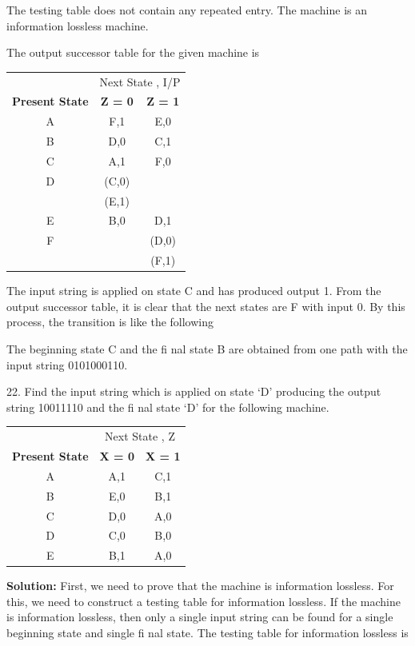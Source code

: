 \documentclass{beamer}
\begin{document}
\begin{frame}
	The testing table does not contain any repeated entry. The machine is an information lossless machine.
	
	The output successor table for the given machine is
	
	\begin{center}
		\begin{tabular}{ccc}
			\hline
			& \multicolumn{2}{c}{Next State , I/P}\\
			\cline{2-3}
			\textbf{Present State} & \textbf{Z = 0} & \textbf{Z = 1}\\
			\hline
			A & F,1 & E,0\\
			B & D,0 & C,1\\
			C & A,1 & F,0\\
			D & (C,0)\\
			& (E,1)\\
			E & B,0 & D,1\\
			F & & (D,0)\\
			& & (F,1)\\
			\hline
		\end{tabular}
	\end{center}
\end{frame}
	\begin{frame}
		The input string is applied on state C and has produced output 1. From the output successor table, it is clear that the next states are F with input 0. By this process, the transition is like the following
		
		
		The beginning state C and the ﬁ nal state B are obtained from one path with the input string 0101000110. 
		
		22. Find the input string which is applied on state ‘D’ producing the output string 10011110 and the ﬁ nal state ‘D’ for the following machine.
		
	\end{frame}
\begin{frame}
	\begin{center}
		\begin{tabular}{ccc}
			\hline
			& \multicolumn{2}{c}{Next State , Z}\\
			\cline{2-3}
			\textbf{Present State} & \textbf{X = 0} & \textbf{X = 1}\\
			\hline
			A & A,1 & C,1\\
			B & E,0 & B,1\\
			C & D,0 & A,0\\
			D & C,0 & B,0\\
			E & B,1 & A,0\\
			\hline
		\end{tabular}
	\end{center}
\textbf{Solution:} First, we need to prove that the machine is information lossless. For this, we need to construct a testing table for information lossless. If the machine is information lossless, then only a single input string can be found for a single beginning state and single ﬁ nal state. The testing table for information lossless is
\end{frame}
\end{document}
